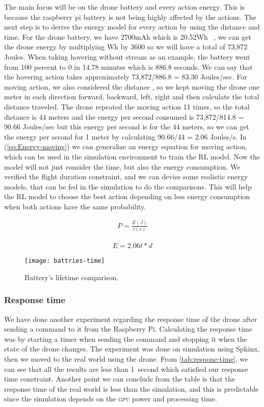 \documentclass[../main.tex]{subfiles}
\begin{document}
The main focus will be on the drone battery and every 
action energy. This is because the raspberry pi battery 
is not being highly affected by the actions. 
The next step is to derive the energy model for every 
action by using the distance and time. For the drone battery, 
we have 2700mAh which is 20.52Wh ~\cite{Par19}, 
we can get the drone energy by multiplying Wh by 3600 
so we will have a total of 73,872 Joules. When taking
hovering without stream as an example, the battery 
went from 100 percent to 0 in 14.78 minutes which is 
886.8 seconds. We can say that the hovering action takes approximately 73,872/886.8 = 83.30 Joules/sec. For moving action,
we also considered the distance , so we kept 
moving the drone one meter in each direction 
{forward, backward, left, right} and then calculate 
the total distance traveled. The drone repeated 
the moving action 11 times, so the total distance 
is 44 meters and the energy per second consumed 
is 73,872/814.8 = 90.66 Joules/sec but this energy 
per second is for the 44 meters, so we can get the 
energy per second for 1 meter by calculating 
90.66/44 = 2.06 Joules/s. 
In (\ref{eq:Energy-moving}) we can generalize an energy equation for moving action, which can be used in the simulation environment to train the RL model. Now the model will not just consider the time, but also the energy consumption.
We verified the flight duration constraint, and we can devise some 
realistic energy models, that can be fed in the simulation to do the comparisons. This will help the RL model to choose 
the best action depending on less energy consumption 
when both actions have the same probability. 

\begin{align}
	P = \frac{E(J)}{t(s)} 
	\label{eq:power}
\end{align}

\begin{align}
	E = 2.06t*d
	\label{eq:Energy-moving}
\end{align}

\begin{figure}[!t]
	\centering
	\texttt{[image: battries-time]}
	\caption{Battery's lifetime comparison.}
	\label{fig:time-comparison}
\end{figure}

\subsubsection{Response time}

We have done another experiment regarding the response time 
of the drone after sending a command to it from the Raspberry Pi. 
Calculating the response time was by starting a timer when 
sending the command and stopping it when the 
state of the drone changes. 
The experiment was done on simulation using Sphinx,
then we moved to the real world using the \anafi drone.
From \cref{tab:respone-time}, 
we can see that all the results are less than \SI{1}{second}
which satisfied our response time constraint.
Another point we can conclude from the table is that 
the response time of the real world is less than 
the simulation, and this is predictable since the simulation
depends on the \textsc{gpu} power and processing time. 
\end{document}
